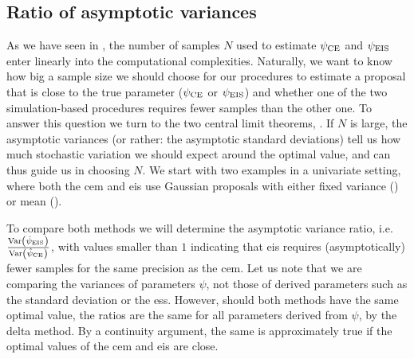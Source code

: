 \subsection{Ratio of asymptotic variances}
\label{subsec:ratio_of_asymptotic_variances}
As we have seen in , the number of samples $N$ used to estimate ${\psi_{\text{CE}}}$ and ${\psi_{\text{EIS}}}$ enter linearly into the computational complexities. Naturally, we want to know how big a sample size we should choose for our procedures to estimate a proposal that is close to the true parameter (${\psi_{\text{CE}}}$ or ${\psi_{\text{EIS}}}$) and whether one of the two simulation-based procedures requires fewer samples than the other one. To answer this question we turn to the two central limit theorems, . If $N$ is large, the asymptotic variances (or rather: the asymptotic standard deviations) tell us how much stochastic variation we should expect around the optimal value, and can thus guide us in choosing $N$. 
We start with two examples in a univariate setting, where both the \gls{cem} and \gls{eis} use Gaussian proposals with either fixed variance () or mean ().

To compare both methods we will determine the asymptotic variance ratio, i.e. $ \frac{\operatorname{Var} \left( {\hat\psi_{\text{EIS}}} \right)}{\operatorname{Var} \left( {\hat\psi_{\text{CE}}} \right)}$, with values smaller than $1$ indicating that \gls{eis} requires (asymptotically) fewer samples for the same precision as the \gls{cem}.
Let us note that we are comparing the variances of parameters $\psi$, not those of derived parameters such as the standard deviation or the \gls{ess}. However, should both methods have the same optimal value, the ratios are the same for all parameters derived from $\psi$, by the delta method. By a continuity argument, the same is approximately true if the optimal values of the \gls{cem} and \gls{eis} are close.

